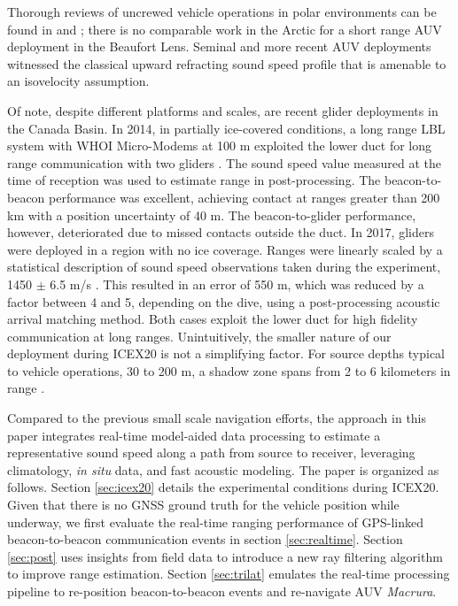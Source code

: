 Thorough reviews of uncrewed vehicle operations in polar environments can be found in \citep{Norgren2014} and \citep{Barker2020}; there is no comparable work in the Arctic for a short range AUV deployment in the Beaufort Lens.
Seminal \citep{brooke1981arcs,jackson1983autonomous,light1989autonomous,bellingham1995auv,hayes2002determining} and more recent AUV deployments \citep{Jakuba2008,Kunz2008,}\citep{jakuba_2008_long,kunz_deep_2008,kukulya2010under,plueddemann_autonomous_2012,timmermans2013scales,fossum2021adaptive} witnessed the classical upward refracting sound speed profile that is amenable to an isovelocity assumption.

Of note, despite different platforms and scales, are recent glider deployments in the Canada Basin.
In 2014, in partially ice-covered conditions, a long range LBL system with WHOI Micro-Modems at 100 m exploited the lower duct for long range communication with two gliders \citep{Freitag2016,Webster2015}.
The sound speed value measured at the time of reception was used to estimate range in post-processing.
The beacon-to-beacon performance was excellent, achieving contact at ranges greater than 200 km with a position uncertainty of 40 m.
The beacon-to-glider performance, however, deteriorated due to missed contacts outside the duct.
In 2017, gliders were deployed in a region with no ice coverage. 
Ranges were linearly scaled by a statistical description of sound speed observations taken during the experiment, 1450 $\pm$ 6.5 m/s \citep{Graupe2019}.
This resulted in an error of 550 m, which was reduced by a factor between 4 and 5, depending on the dive, using a post-processing acoustic arrival matching method.
Both cases exploit the lower duct for high fidelity communication at long ranges.
Unintuitively, the smaller nature of our deployment during ICEX20 is not a simplifying factor.
For source depths typical to vehicle operations, 30 to 200 m, a shadow zone spans from 2 to 6 kilometers in range \citep{Schmidt2016}.

Compared to the previous small scale navigation efforts, the approach in this paper integrates real-time model-aided data processing to estimate a representative sound speed along a path from source to receiver, leveraging climatology, \textit{in situ} data, and fast acoustic modeling.
The paper is organized as follows.
Section \ref{sec:icex20} details the experimental conditions during ICEX20.
Given that there is no GNSS ground truth for the vehicle position while underway, we first evaluate the real-time ranging performance of GPS-linked beacon-to-beacon communication events in section \ref{sec:realtime}.
Section \ref{sec:post} uses insights from field data to introduce a new ray filtering algorithm to improve range estimation.
Section \ref{sec:trilat} emulates the real-time processing pipeline to re-position beacon-to-beacon events and re-navigate AUV \emph{Macrura}.

